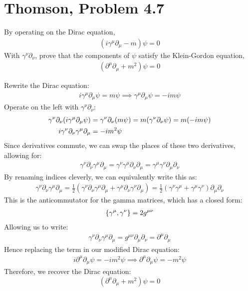 \documentclass[12pt]{article}
\newcommand{\D}{\partial}
\begin{document}
\section{Thomson, Problem 4.7}
\begin{problem}
  By operating on the Dirac equation,
  \begin{align*}
    (i\gamma^\mu\D_\mu-m)\psi=0
  \end{align*}
  With $\gamma^\nu\D_\nu$, prove that the components of $\psi$ satisfy the Klein-Gordon equation,
  \begin{align*}
    (\D^\mu\D_\mu+m^2)\psi=0
  \end{align*}
\end{problem}
Rewrite the Dirac equation:
\begin{align*}
  i\gamma^\mu\D_\mu\psi=m\psi\implies\gamma^\mu\D_\mu\psi=-im\psi
\end{align*}
Operate on the left with $\gamma^\nu\D_\nu$:
\begin{align*}
  \gamma^\nu\D_\nu\qty(i\gamma^\mu\D_\mu\psi)&=\gamma^\nu\D_\nu(m\psi)
  =m(\gamma^\nu\D_\nu\psi)=m(-im\psi)\\
  i\gamma^\nu\D_\nu\gamma^\mu\D_\mu&=-im^2\psi
\end{align*}
Since derivatives commute, we can swap the places of these two derivatives, allowing for:
\begin{align*}
  \gamma^\nu\D_\nu\gamma^\mu\D_\mu=\gamma^\nu\gamma^\mu\D_\nu\D_\mu
  =\gamma^\mu\gamma^\nu\D_\mu\D_\nu
\end{align*}
By renaming indices cleverly, we can equivalently write this as:
\begin{align*}
  \gamma^\nu\D_\nu\gamma^\mu\D_\mu=
  \frac12(\gamma^\nu\D_\nu\gamma^\mu\D_\mu+\gamma^\mu\D_\nu\gamma^\nu\D_\mu)
  =\frac12(\gamma^\nu\gamma^\mu+\gamma^\mu\gamma^\nu)\D_\mu\D_\nu
\end{align*}
This is the anticommutator for the gamma matrices, which has a closed form:
\begin{align*}
  \acomm{\gamma^\mu}{\gamma^\nu}=2g^{\mu\nu}
\end{align*}
Allowing us to write:
\begin{align*}
  \gamma^\nu\D_\nu\gamma^\mu\D_\mu=g^{\mu\nu}\D_\mu\D_\nu=\D^\mu\D_\mu
\end{align*}
Hence replacing the term in our modified Dirac equation:
\begin{align*}
  i\D^\mu\D_\mu\psi=-im^2\psi\implies \D^\mu\D_\mu\psi=-m^2\psi
\end{align*}
Therefore, we recover the Dirac equation:
\begin{equation}
  \label{eq:p3}
  \boxed{(\D^\mu\D_\mu+m^2)\psi=0}
\end{equation}
\newpage
\end{document}
